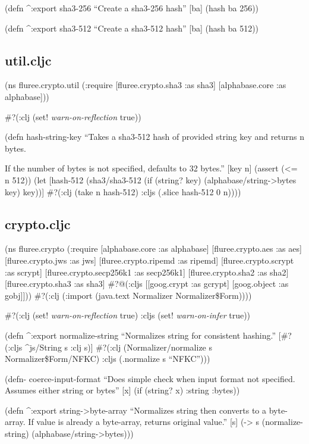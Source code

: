 \documentclass[
]{article}
\begin{document}
(defn \^{}:export sha3-256 ``Create a sha3-256 hash'' {[}ba{]} (hash ba
256))

(defn \^{}:export sha3-512 ``Create a sha3-512 hash'' {[}ba{]} (hash ba
512))

\subsection{util.cljc}\label{util.cljc}

(ns fluree.crypto.util (:require {[}fluree.crypto.sha3 :as sha3{]}
{[}alphabase.core :as alphabase{]}))

\#?(:clj (set! \emph{warn-on-reflection} true))

(defn hash-string-key ``Takes a sha3-512 hash of provided string key and
returns n bytes.

If the number of bytes is not specified, defaults to 32 bytes.'' {[}key
n{]} (assert (\textless= n 512)) (let {[}hash-512 (sha3/sha3-512 (if
(string? key) (alphabase/string-\textgreater bytes key) key)){]}
\#?(:clj (take n hash-512) :cljs (.slice hash-512 0 n))))

\subsection{crypto.cljc}\label{crypto.cljc}

(ns fluree.crypto (:require {[}alphabase.core :as alphabase{]}
{[}fluree.crypto.aes :as aes{]} {[}fluree.crypto.jws :as jws{]}
{[}fluree.crypto.ripemd :as ripemd{]} {[}fluree.crypto.scrypt :as
scrypt{]} {[}fluree.crypto.secp256k1 :as secp256k1{]}
{[}fluree.crypto.sha2 :as sha2{]} {[}fluree.crypto.sha3 :as sha3{]}
\#?@(:cljs {[}{[}goog.crypt :as gcrypt{]} {[}goog.object :as
gobj{]}{]})) \#?(:clj (:import (java.text Normalizer
Normalizer\$Form))))

\#?(:clj (set! \emph{warn-on-reflection} true) :cljs (set!
\emph{warn-on-infer} true))

(defn \^{}:export normalize-string ``Normalizes string for consistent
hashing.'' {[}\#?(:cljs \^{}js/String s :clj s){]} \#?(:clj
(Normalizer/normalize s Normalizer\$Form/NFKC) :cljs (.normalize s
``NFKC'')))

(defn- coerce-input-format ``Does simple check when input format not
specified. Assumes either string or bytes'' {[}x{]} (if (string? x)
:string :bytes))

(defn \^{}:export string-\textgreater byte-array ``Normalizes string
then converts to a byte-array. If value is already a byte-array, returns
original value.'' {[}s{]} (-\textgreater{} s (normalize-string)
(alphabase/string-\textgreater bytes)))
\end{document}
